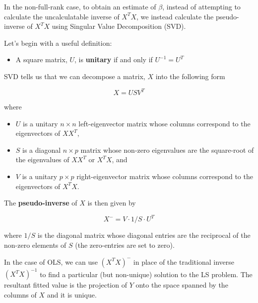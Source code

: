 In the non-full-rank case, to obtain an estimate of $\beta$, instead of attempting to calculate the uncalculatable inverse of $X^TX$, we instead calculate the pseudo-inverse of $X^TX$ using Singular Value Decomposition (SVD). 

Let's begin with a useful definition:

\begin{itemize}
\item A square matrix, $U$, is {\bf unitary} if and only if $U^{-1} = U^T$
\end{itemize}

SVD tells us that we can decompose a matrix, $X$ into the following form

$$X = U S V^T$$

where
\begin{itemize}
\item $U$ is a unitary $n \times n$ left-eigenvector matrix whose columns correspond to the eigenvectors of $XX^T$, 
\item $S$ is a diagonal $n \times p$ matrix whose non-zero eigenvalues are the square-root of the eigenvalues of $XX^T$ or $X^TX$, and 
\item $V$ is a unitary $p \times p$ right-eigenvector matrix whose columns correspond to the eigenvectors of $X^TX$.
\end{itemize}



The {\bf pseudo-inverse} of $X$ is then given by

$$X^{-} = V \cdot 1/S \cdot U^T$$

where $1/S$ is the diagonal matrix whose diagonal entries are the reciprocal of the non-zero elements of $S$ (the zero-entries are set to zero).

In the case of OLS, we can use $\left(X^TX\right)^{-}$ in place of the traditional inverse $\left(X^TX\right)^{-1}$ to find a particular (but non-unique) solution to the LS problem. The resultant fitted value is the projection of $Y$ onto the space spanned by the columns of $X$ and it is unique.


